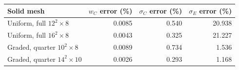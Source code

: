 \begin{tabularx}{\linewidth}{Xrrr}
\toprule
Solid mesh & $w_C$ error (\%) & $\sigma_C$ error (\%) & $\sigma_E$ error (\%) \\
\midrule
Uniform, full $12^2\times8$ & 0.0085 & 0.540 & 20.938 \\
Uniform, full $16^2\times8$ & 0.0043 & 0.325 & 21.227 \\
Graded, quarter $10^2\times8$ & 0.0089 & 0.734 & 1.536 \\
Graded, quarter $14^2\times10$ & 0.0026 & 0.293 & 1.168 \\
\bottomrule
\end{tabularx}
